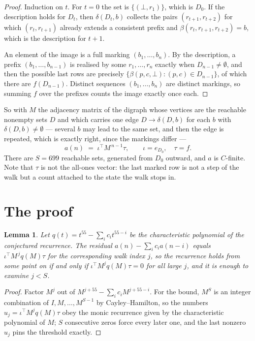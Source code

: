 \documentclass[11pt,a4paper]{article}
\theoremstyle{plain}
\newtheorem{lemma}[theorem]{Lemma}
\theoremstyle{definition}
\begin{document}
\begin{proof}
Induction on $t$. For $t=0$ the set is $\{(\bot,r_1)\}$, which is $D_0$. If the description
holds for $D_t$, then $\delta(D_t,b)$ collects the pairs $(r_{t+1},r_{t+2})$ for which
$(r_t,r_{t+1})$ already extends a consistent prefix and
$\beta(r_t,r_{t+1},r_{t+2})=b$, which is the description for $t+1$.

An element of the image is a full marking $(b_1,\dots,b_n)$. By the description, a prefix
$(b_1,\dots,b_{n-1})$ is realised by some $r_1,\dots,r_n$ exactly when $D_{n-1}\neq
\emptyset$, and then the possible last rows are precisely
$\{\beta(p,c,\bot):(p,c)\in D_{n-1}\}$, of which there are $f(D_{n-1})$. Distinct
sequences $(b_1,\dots,b_n)$ are distinct markings, so summing $f$ over the prefixes counts the
image exactly once each.
\end{proof}

So with $M$ the adjacency matrix of the digraph whose vertices are the reachable nonempty sets
$D$ and which carries one edge $D\to\delta(D,b)$ for each $b$ with $\delta(D,b)\neq\emptyset$
--- several $b$ may lead to the same set, and then the edge is repeated, which is exactly
right, since the markings differ ---
\[
a(n)\;=\;\iota^{\!\top}M^{\,n-1}\tau,\qquad \iota=e_{D_0},\quad \tau=f .
\]
There are $S=699$ reachable sets, generated from $D_0$ outward, and $a$ is $C$-finite. Note
that $\tau$ is not the all-ones vector: the last marked row is not a step of the walk but a
count attached to the state the walk stops in.

\section{The proof}

\begin{lemma}\label{lem:crit}
Let $q(t)=t^{55}-\sum_i c_it^{55-i}$ be the characteristic polynomial of the
conjectured recurrence. The residual $a(n)-\sum_ic_ia(n-i)$ equals
$\iota^{\!\top}M^{\,j}q(M)\tau$ for the corresponding walk index $j$, so the recurrence
holds from some point on if and only if $\iota^{\!\top}M^{j}q(M)\tau=0$ for all large $j$,
and it is enough to examine $j<S$.
\end{lemma}

\begin{proof}
Factor $M^{j}$ out of $M^{j+55}-\sum_ic_iM^{j+55-i}$. For the bound, $M^{S}$
is an integer combination of $I,M,\dots,M^{S-1}$ by Cayley--Hamilton, so the numbers
$u_j=\iota^{\!\top}M^{j}q(M)\tau$ obey the monic recurrence given by the characteristic
polynomial of $M$; $S$ consecutive zeros force every later one, and the last nonzero $u_j$
pins the threshold exactly.
\end{proof}
\end{document}
